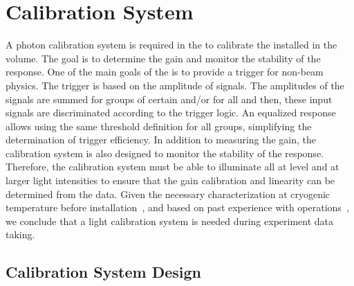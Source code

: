 \section{Calibration System}
\label{sec:dp-pds-calibration}

A photon calibration system is required in the  to calibrate the  installed in the  volume. The goal is to determine the  gain and monitor the stability of the  response. One of the main goals of the  is to provide a trigger for non-beam physics. The trigger is based on the amplitude of  signals. The amplitudes of the  signals are summed for groups of certain  and/or for all  and then, these input signals are discriminated according to the trigger logic. An equalized  response allows using the same threshold definition for all  groups, simplifying the determination of trigger efficiency. In addition to measuring the  gain, the calibration system is also designed to monitor the stability of the  response. %
Therefore, the calibration system must be able to illuminate all  at  level and at larger light intensities to ensure that the gain calibration and linearity can be determined from the data. Given the necessary  characterization at cryogenic temperature before installation~\cite{Belver:2018erf}, and based on past experience with  %
operations~\cite{Aimard:2018yxp}, we conclude that a light calibration system is needed during experiment data taking.


\subsection{Calibration System Design}

